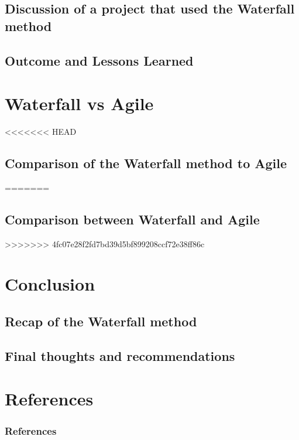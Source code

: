 \documentclass{beamer}
\begin{document}
\subsection{Discussion of a project that used the Waterfall method}
\subsection{Outcome and Lessons Learned}



\section{Waterfall vs Agile}
<<<<<<< HEAD
\subsection{Comparison of the Waterfall method to Agile}


=======
\subsection{Comparison between Waterfall and Agile}

>>>>>>> 4fc07e28f2fd7bd39d5bf899208ccf72e38ff86c

\section{Conclusion}
\subsection{Recap of the Waterfall method}
\subsection{Final thoughts and recommendations}



\section*{References}
\begin{frame}
    \frametitle{References}
    
    
\end{frame}
\end{document}
